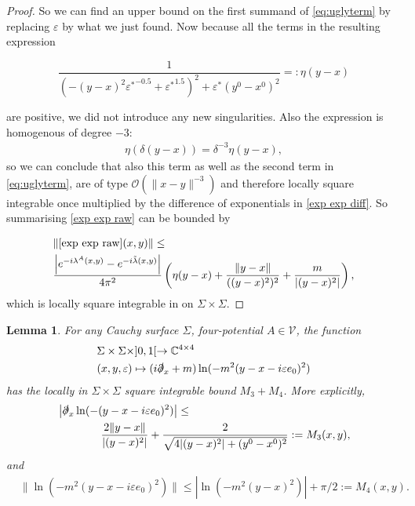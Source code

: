 \documentclass[b5paper,draft,openbib,12pt]{memoir}
\newtheorem{Lemma}[Def]{Lemma}
\begin{document}
\begin{proof}
So we can find an upper bound on the first summand of \eqref{eq:uglyterm} by replacing \(\varepsilon\) by what we just found. 
Now because all the terms in the resulting expression

\begin{equation}
\frac{1}{(-(y-x)^2 {\varepsilon^*}^{-0.5}+{\varepsilon^*}^{1.5})^2+\varepsilon^*(y^0-x^0)^2}=:\eta(y-x)
\end{equation}

are positive, we did not introduce any new singularities. Also the expression is homogenous of degree \(-3\):
\begin{align}
\eta(\delta(y-x))=\delta^{-3} \eta(y-x),
\end{align}
so we can conclude that also this term as well as the 
second term in \eqref{eq:uglyterm}, are of type 
\(\mathcal{O}(\|x-y\|^{-3})\) and therefore
locally square integrable once multiplied by the 
difference of exponentials in \eqref{exp exp diff}. So 
summarising
\eqref{exp exp raw} can be bounded by 

\begin{align}\nonumber
&\| \eqref{exp exp raw}(x,y)\|\le\\ \label{bound ivp2}
& \frac{\left| e^{-i\lambda^A(x,y)}-e^{-i\tilde{\lambda}(x,y)} \right|}{4\pi^2}\left(\eta(y-x)+\frac{\|y-x\|}{((y-x)^2)^2} + \frac{m}{|(y-x)^2|}\right),
\end{align}
which is locally square integrable in on \(\Sigma\times \Sigma\).
\end{proof}

\begin{Lemma}\label{lem:log term}
For any Cauchy surface \(\Sigma\), 
four-potential \(A\in \mathcal{V}\), the function 
\begin{align}
&\Sigma\times \Sigma \times ]0,1[\rightarrow \mathbb{C}^{4\times 4}\\\label{midterm}
&(x,y,\varepsilon)\mapsto (i\slashed{\partial}_x+m) \ln(-m^2(y-x-i\varepsilon e_0)^2)
\end{align}
has the locally in \(\Sigma\times\Sigma\) square integrable bound
\(M_3+M_4\). More explicitly,
\begin{align}
&\left|\slashed{\partial}_x\ln(-(y-x-i\varepsilon e_0)^2)\right|\le\\
& ~~~~~~~~~~~~\frac{2\|y-x\|}{|(y-x)^2|} + \frac{2}{\sqrt{4|(y-x)^2| + (y^0-x^0)^2}}:=M_3(x,y),
\end{align}
and
\begin{align}
& \| \ln(-m^2(y-x-i\varepsilon e_0)^2)\| \le  |\ln(-m^2(y-x)^2)| +\pi/2:=M_4(x,y).
\end{align}
\end{Lemma}
\end{document}
